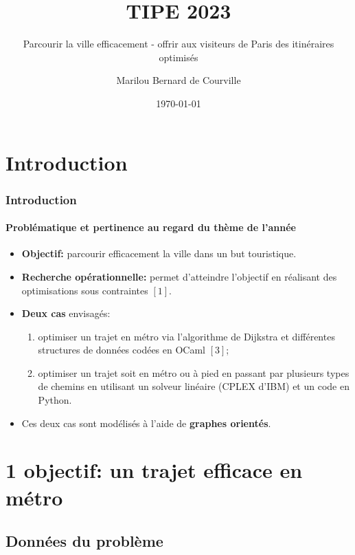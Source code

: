 \documentclass[10pt]{beamer}
\title{TIPE 2023}
\subtitle{Parcourir la ville efficacement - offrir aux visiteurs de Paris des itinéraires optimisés}
\author{Marilou Bernard de Courville}
\institute{N\textsuperscript{\underline{o}} SCEI 41188}
\date{\today}
\begin{document}
 
\begin{frame}
    \titlepage
\end{frame}


\section{Introduction}

\begin{frame}
\frametitle{Introduction}
\framesubtitle{Problématique et pertinence au regard du thème de l'année}

\begin{itemize}
\item \textbf{Objectif:} parcourir efficacement la ville dans un but touristique.
\item \textbf{Recherche opérationnelle:} permet d'atteindre l'objectif en réalisant des optimisations sous contraintes $[1]$.
\item \textbf{Deux cas} envisagés:
  \begin{enumerate}
  \item optimiser un trajet en métro via l'algorithme de Dijkstra et différentes structures de données codées en OCaml $[3]$;
  \item optimiser un trajet soit en métro ou à pied en passant par plusieurs types de chemins en utilisant un solveur linéaire (CPLEX d'IBM) et un code en Python.
  \end{enumerate}
\item Ces deux cas sont modélisés à l'aide de \textbf{graphes orientés}.
\end{itemize}

\end{frame}

\section{\textbf{1\ier{} objectif}: un trajet efficace en métro}

\subsection{Données du problème}
\end{document}
